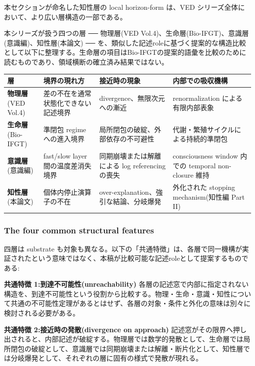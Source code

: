 本セクションが命名した知性層の local horizon-form は、VED シリーズ全体において、より広い層構造の一部である。

本シリーズが扱う四つの層 ── 物理層(VED Vol.4)、生命層(Bio-IFGT)、意識層(意識編)、知性層(本論文) ── を、類似した記述roleに基づく提案的な構造比較として以下に整理する。生命層の項目はBio-IFGTの提案的語彙を比較のために読むものであり、領域横断の確立済み結果ではない。

\begin{table}[H]
\centering
\small
\begin{tabularx}{\textwidth}{>{\raggedright\arraybackslash}X>{\raggedright\arraybackslash}X>{\raggedright\arraybackslash}X>{\raggedright\arraybackslash}X}
\toprule
層 & 境界の現れ方 & 接近時の現象 & 内部での吸収機構 \\
\midrule
\textbf{物理層} (VED Vol.4) & 差の不在を通常状態化できない記述境界 & divergence、無限次元への漸近 & renormalization による有限内部表象 \\
\textbf{生命層} (Bio-IFGT) & 準閉包 regime への進入境界 & 局所閉包の破綻、外部依存の不可避性 & 代謝・繁殖サイクルによる持続的準閉包 \\
\textbf{意識層} (意識編) & fast/slow layer 間の温度差消失境界 & 同期崩壊または解離による log referencing の喪失 & consciousness window 内での temporal non-closure 維持 \\
\textbf{知性層} (本論文) & 個体内停止演算子の不在 & over-explanation、強引な結論、分岐爆発 & 外化された stopping mechanism(知性編 Part II) \\
\bottomrule
\end{tabularx}
\end{table}


\subsubsection{The four common structural features}


四層は substrate も対象も異なる。以下の「共通特徴」は、各層で同一機構が実証されたという意味ではなく、本稿が比較可能な記述roleとして提案するものである:

\textbf{共通特徴 1:到達不可能性(unreachability)}
各層の記述窓で内部に指定されない構造を、到達不可能性という役割から比較する。物理・生命・意識・知性について共通の不可能性定理があるとはせず、各層の対象・条件と外化の意味は別々に検討される必要がある。

\textbf{共通特徴 2:接近時の発散(divergence on approach)}
記述窓がその限界へ押し出されると、内部記述が破綻する。物理層では数学的発散として、生命層では局所閉包の破綻として、意識層では同期崩壊または解離・断片化として、知性層では分岐爆発として、それぞれの層に固有の様式で発散が現れる。

